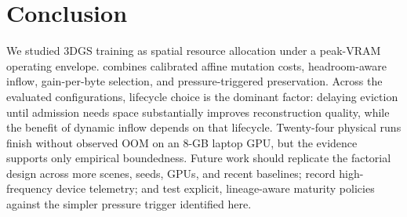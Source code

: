 \section{Conclusion}
We studied 3DGS training as spatial resource allocation under a peak-VRAM operating envelope. \method combines calibrated affine mutation costs, headroom-aware inflow, gain-per-byte selection, and pressure-triggered preservation. Across the evaluated configurations, lifecycle choice is the dominant factor: delaying eviction until admission needs space substantially improves reconstruction quality, while the benefit of dynamic inflow depends on that lifecycle. Twenty-four physical runs finish without observed OOM on an 8-GB laptop GPU, but the evidence supports only empirical boundedness. Future work should replicate the factorial design across more scenes, seeds, GPUs, and recent baselines; record high-frequency device telemetry; and test explicit, lineage-aware maturity policies against the simpler pressure trigger identified here.
